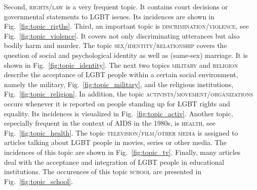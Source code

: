 \documentclass[10pt,a4paper,twocolumn]{scrartcl}
\begin{document}
Second, \textsc{rights/law} is a very frequent topic. It contains court decisions or governmental statements to LGBT issues. Its incidences are shown in Fig.~\ref{fig:topic_rigths}. Third, an important topic is \textsc{discrimination/violence}, see Fig.~\ref{fig:topic_violence}. It covers not only discriminating utterances but also bodily harm and murder. The topic \textsc{sex/identity/relationship} covers the question of social and psychological identity as well as (same-sex) marriage. It is shown in Fig.~\ref{fig:topic_identity}. The next two topics \textsc{military} and \textsc{religion} describe the acceptance of LGBT people within a certain social environment, namely the military, Fig.~\ref{fig:topic_military}, and the religious institutions, Fig.~\ref{fig:topic_religion}. In addition, the topic \textsc{activists/movement/organizations} occurs whenever it is reported on people standing up for LGBT rights and equality. Its incidences is visualized in Fig.~\ref{fig:topic_activ}. Another topic, especially frequent in the context of AIDS in the 1980s, is \textsc{health}, see Fig.~\ref{fig:topic_health}. The topic \textsc{television/film/other media} is assigned to articles talking about LGBT people in movies, series or other media. The incidences of this topic are shown in Fig.~\ref{fig:topic_tv}. Finally, many articles deal with the acceptance and integration of LGBT people in educational institutions. The occurences of this topic \textsc{school} are presented in Fig.~\ref{fig:topic_school}.
\end{document}

